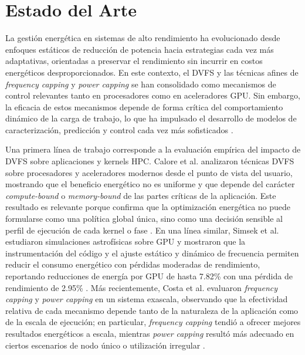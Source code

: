 \documentclass[12pt,oneside,spanish]{book}
\begin{document}
\section{Estado del Arte}

La gestión energética en sistemas de alto rendimiento ha evolucionado desde enfoques estáticos de reducción de potencia hacia estrategias cada vez más adaptativas, orientadas a preservar el rendimiento sin incurrir en costos energéticos desproporcionados. En este contexto, el DVFS y las técnicas afines de \textit{frequency capping} y \textit{power capping} se han consolidado como mecanismos de control relevantes tanto en procesadores como en aceleradores GPU. Sin embargo, la eficacia de estos mecanismos depende de forma crítica del comportamiento dinámico de la carga de trabajo, lo que ha impulsado el desarrollo de modelos de caracterización, predicción y control cada vez más sofisticados \cite{Simsek2024,Costa2025,Calore2017,Ali2023,Guerreiro2019}.

Una primera línea de trabajo corresponde a la evaluación empírica del impacto de DVFS sobre aplicaciones y kernels HPC. Calore et al. analizaron técnicas DVFS sobre procesadores y aceleradores modernos desde el punto de vista del usuario, mostrando que el beneficio energético no es uniforme y que depende del carácter \textit{compute-bound} o \textit{memory-bound} de las partes críticas de la aplicación. Este resultado es relevante porque confirma que la optimización energética no puede formularse como una política global única, sino como una decisión sensible al perfil de ejecución de cada kernel o fase \cite{Calore2017}. En una línea similar, Simsek et al. estudiaron simulaciones astrofísicas sobre GPU y mostraron que la instrumentación del código y el ajuste estático y dinámico de frecuencia permiten reducir el consumo energético con pérdidas moderadas de rendimiento, reportando reducciones de energía por GPU de hasta 7.82\% con una pérdida de rendimiento de 2.95\% \cite{Simsek2024}. Más recientemente, Costa et al. evaluaron \textit{frequency capping} y \textit{power capping} en un sistema exascala, observando que la efectividad relativa de cada mecanismo depende tanto de la naturaleza de la aplicación como de la escala de ejecución; en particular, \textit{frequency capping} tendió a ofrecer mejores resultados energéticos a escala, mientras \textit{power capping} resultó más adecuado en ciertos escenarios de nodo único o utilización irregular \cite{Costa2025}.
\end{document}
